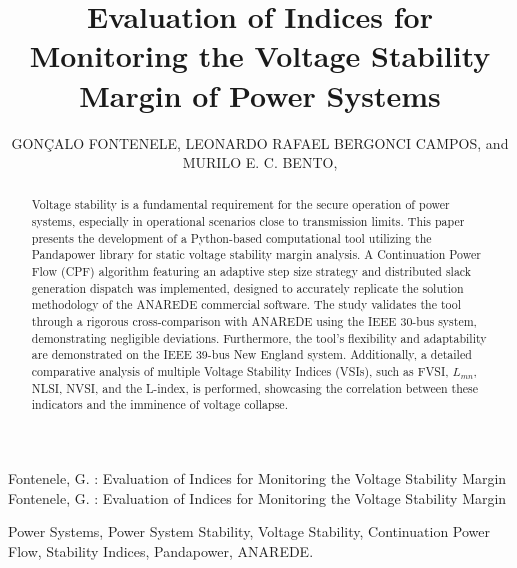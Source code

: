 \documentclass{ieeeaccess}
\begin{document}

\title{Evaluation of Indices for Monitoring the Voltage Stability Margin of Power Systems}

\author{\uppercase{Gonçalo Fontenele}, \uppercase{Leonardo Rafael Bergonci Campos}, and
	\uppercase{Murilo E. C. Bento}, }

\address[1]{Department of Electrical Engineering, Federal University of Rio de Janeiro, Rio de Janeiro, RJ 21941-909, Brazil (e-mails: goncalogfb@poli.ufrj.br, bergoncileo@gmail.com, murilobento@poli.ufrj.br)}

\markboth
{Fontenele, G. \headeretal: Evaluation of Indices for Monitoring the Voltage Stability Margin}
{Fontenele, G. \headeretal: Evaluation of Indices for Monitoring the Voltage Stability Margin}


\begin{abstract}
Voltage stability is a fundamental requirement for the secure operation of power systems, especially in operational scenarios close to transmission limits. This paper presents the development of a Python-based computational tool utilizing the Pandapower library for static voltage stability margin analysis. A Continuation Power Flow (CPF) algorithm featuring an adaptive step size strategy and distributed slack generation dispatch was implemented, designed to accurately replicate the solution methodology of the ANAREDE commercial software. The study validates the tool through a rigorous cross-comparison with ANAREDE using the IEEE 30-bus system, demonstrating negligible deviations. Furthermore, the tool's flexibility and adaptability are demonstrated on the IEEE 39-bus New England system. Additionally, a detailed comparative analysis of multiple Voltage Stability Indices (VSIs), such as FVSI, $L_{mn}$, NLSI, NVSI, and the L-index, is performed, showcasing the correlation between these indicators and the imminence of voltage collapse.
\end{abstract}

\begin{keywords}
Power Systems, Power System Stability, Voltage Stability, Continuation Power Flow, Stability Indices, Pandapower, ANAREDE.
\end{keywords}
\end{document}
